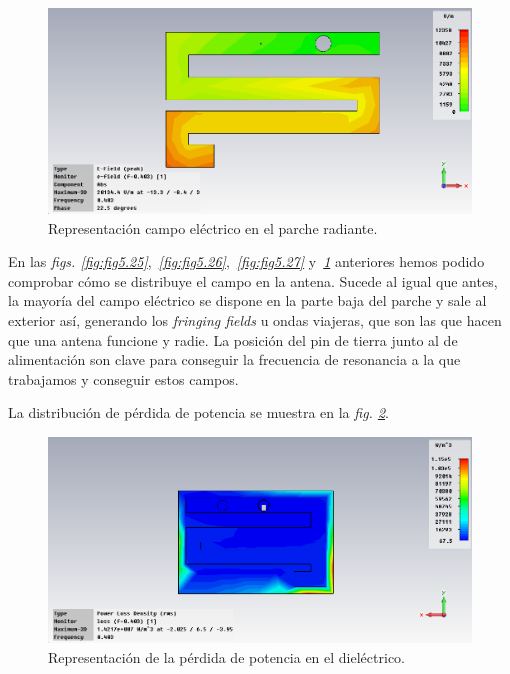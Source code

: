\begin{figure}[!htb]
    \centering
    \includegraphics[scale=0.4]{./Simulaciones/tunned_antenna_muscle/tunned_serpentine_muscle_E-Field_4}
    \caption{Representación campo eléctrico en el parche radiante.}
    \label{fig:fig5.28}
\end{figure}

En las \textit{figs. \ref{fig:fig5.25}},~\textit{\ref{fig:fig5.26}},~\textit{\ref{fig:fig5.27}} y~\textit{\ref{fig:fig5.28}} anteriores hemos podido comprobar cómo se distribuye el campo en la antena. Sucede al igual que antes, la mayoría del campo eléctrico se dispone en la parte baja del parche y sale al exterior así, generando los \textit{fringing fields} u ondas viajeras, que son las que hacen que una antena funcione y radie. La posición del pin de tierra junto al de alimentación son clave para conseguir la frecuencia de resonancia a la que trabajamos y conseguir estos campos.

La distribución de pérdida de potencia se muestra en la \textit{fig. \ref{fig:fig5.29}}.

\begin{figure}[!htb]
    \centering
    \includegraphics[scale=0.5]{./Simulaciones/tunned_antenna_muscle/tunned_serpentine_muscle_power_loss}
    \caption{Representación de la pérdida de potencia en el dieléctrico.}
    \label{fig:fig5.29}
\end{figure}

